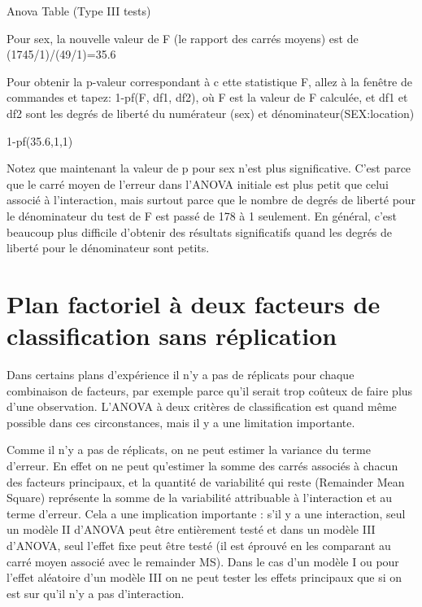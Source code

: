 \documentclass[12pt,]{book}
\begin{document}
Anova Table (Type III tests)

Pour sex, la nouvelle valeur de F (le rapport des carrés moyens) est de (1745/1)/(49/1)=35.6

Pour obtenir la p-valeur correspondant à c ette statistique F, allez à la fenêtre de commandes et tapez: 1-pf(F, df1, df2), où F est la valeur de F calculée, et df1 et df2 sont les degrés de liberté du numérateur (sex) et dénominateur(SEX:location)

1-pf(35.6,1,1)

Notez que maintenant la valeur de p pour sex n'est plus significative. C'est parce que le carré moyen de l'erreur dans l'ANOVA initiale est plus petit que celui associé à l'interaction, mais surtout parce que le nombre de degrés de liberté pour le dénominateur du test de F est passé de 178 à 1 seulement. En général, c'est beaucoup plus difficile d'obtenir des résultats significatifs quand les degrés de liberté pour le dénominateur sont petits.

\hypertarget{plan-factoriel-uxe0-deux-facteurs-de-classification-sans-ruxe9plication}{%
\section{Plan factoriel à deux facteurs de classification sans réplication}\label{plan-factoriel-uxe0-deux-facteurs-de-classification-sans-ruxe9plication}}

Dans certains plans d'expérience il n'y a pas de réplicats pour chaque combinaison de facteurs, par exemple parce qu'il serait trop coûteux de faire plus d'une observation. L'ANOVA à deux critères de classification est quand même possible dans ces circonstances, mais il y a une limitation importante.

Comme il n'y a pas de réplicats, on ne peut estimer la variance du terme d'erreur. En effet on ne peut qu'estimer la somme des carrés associés à chacun des facteurs principaux, et la quantité de variabilité qui reste (Remainder Mean Square) représente la somme de la variabilité attribuable à l'interaction et au terme d'erreur. Cela a une implication importante : s'il y a une interaction, seul un modèle II d'ANOVA peut être entièrement testé et dans un modèle III d'ANOVA, seul l'effet fixe peut être testé (il est éprouvé en les comparant au carré moyen associé avec le remainder MS). Dans le cas d'un modèle I ou pour l'effet aléatoire d'un modèle III on ne peut tester les effets principaux que si on est sur qu'il n'y a pas d'interaction.
\end{document}
